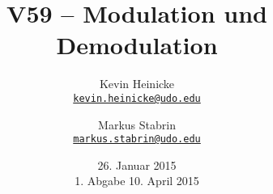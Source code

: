 


\title{%
    V59 -- Modulation und Demodulation
}
\author{%
    Kevin Heinicke\\
    \texttt{\href{mailto:kevin.heinicke@udo.edu}{kevin.heinicke@udo.edu}}
    \and
    Markus Stabrin\\
    \texttt{\href{mailto:markus.stabrin@udo.edu}{markus.stabrin@udo.edu}}
}
\date{%
    26. Januar 2015\\
    {\small 1. Abgabe} 10. April 2015
}

    \maketitle%
    \tableofcontents
    \newpage

    
    

    \printbibliography

